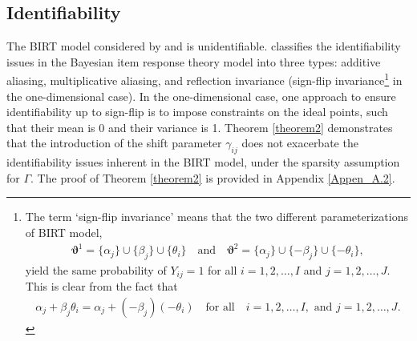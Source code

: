 \documentclass[11pt]{article}
\begin{document}
\subsection{Identifiability}\label{sub_sec_4.2}
The BIRT model considered by \cite{Clinton2004} and \cite{Imai2016} is unidentifiable. \cite{Gelman2005} classifies the identifiability issues in the Bayesian item response theory model into three types: additive aliasing, multiplicative aliasing, and reflection invariance (sign-flip invariance\footnote{The term `sign-flip invariance' means that the two different parameterizations of BIRT model, 
\begin{align*}
\boldsymbol{\vartheta}^1 = \{\alpha_j\} \cup \{\beta_j\} \cup \{\theta_i\} \quad \text{and}  \quad \boldsymbol{\vartheta}^2 = \{\alpha_j\} \cup \{-\beta_j\} \cup \{-\theta_i\} ,
\end{align*}
yield the same probability of $ Y_{ij} = 1 $ for all $ i = 1, 2, \ldots, I $ and $ j = 1, 2, \ldots, J $. This is clear from the fact that 
\begin{align*}
    \alpha_j + \beta_j \theta_i = \alpha_j + (-\beta_j)(-\theta_i) \quad \text{for all}\quad  i = 1, 2, \ldots, I, \text{ and } j = 1, 2, \ldots, J.
\end{align*}} in the one-dimensional case). In the one-dimensional case, one approach to ensure identifiability up to sign-flip is to impose constraints on the ideal points, such that their mean is 0 and their variance is 1.
Theorem \ref{theorem2} demonstrates that the introduction of the shift parameter $ \gamma_{ij} $ does not exacerbate the identifiability issues inherent in the BIRT model, under the sparsity assumption for $ \Gamma $. The proof of Theorem \ref{theorem2} is provided in Appendix \ref{Appen_A.2}.
\end{document}
